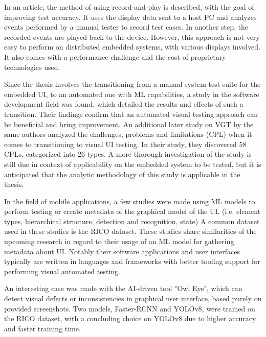 \documentclass[Proposal,BIC,english,IEEE]{BASE/twbook} %
\begin{document}
In an article, \autocite{linImprovingAccuracyAutomated2014} the method of using record-and-play is described, with the goal of improving test accuracy. It uses the display data sent to a host PC and analyzes events performed by a manual tester to record test cases. In another step, the recorded events are played back to the device. However, this approach is not very easy to perform on distributed embedded systems, with various displays involved. It also comes with a performance challenge and the cost of proprietary technologies used.

Since the thesis involves the transitioning from a manual system test suite for the embedded UI, to an automated one with ML capabilities, a study \autocite{alegrothTransitioningManualSystem2013} in the software development field was found, which detailed the results and effects of such a transition. Their findings confirm that an automated visual testing approach can be beneficial and bring improvement.
An additional later study on VGT by the same authors analyzed the challenges, problems and limitations (CPL) when it comes to transitioning to visual UI testing.\autocite{alegrothVisualGUITesting2015} In their study, they discovered 58 CPLs, categorized into 26 types. A more thorough investigation of the study is still due in context of applicability on the embedded system to be tested, but it is anticipated that the analytic methodology of this study is applicable in the thesis.

In the field of mobile applications, a few studies were made using ML models to perform testing or create metadata of the graphical model of the UI. (i.e. element types, hierarchical structure, detection and recognition, state)
\autocite{altinbasGUIElementDetection2022,chengMobileApplicationGUI2021,liWidgetCaptioningGenerating2020,selcukComparisonYOLOv5YOLOv82023,zhangDeepLearningBasedMobile2020,zhangMachineVisionbasedTesting2022, cavsakGUIComponentDetection} A common dataset used in these studies is the RICO dataset\autocite{dekaRicoMobileApp2017}.
These studies share similarities of the upcoming research in regard to their usage of an ML model for gathering metadata about UI. Notably their software applications and user interfaces typically are written in languages and frameworks with better tooling support for performing visual automated testing.

An interesting case was made with the AI-driven tool "Owl Eye"\autocite{gamalOwlEyeAIDriven2023}, which can detect visual defects or inconsistencies in graphical user interface, based purely on provided screenshots. Two models, Faster-RCNN and YOLOv8, were trained on the RICO dataset, with a concluding choice on YOLOv8 due to higher accuracy and faster training time.
\end{document}
